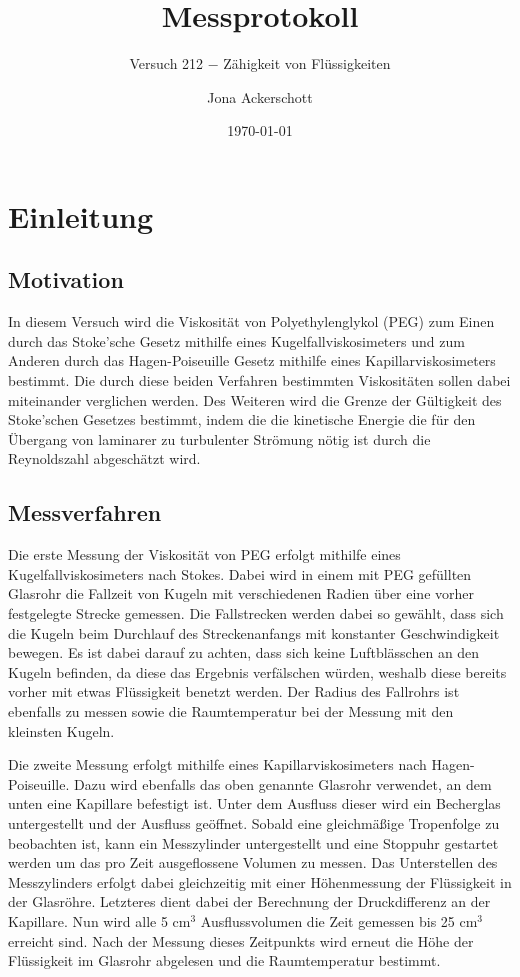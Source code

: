 \documentclass[12pt,a4paper,german]{scrartcl}
\author{Jona Ackerschott}
\title{Messprotokoll}
\subtitle{Versuch 212 $-$ Zähigkeit von Flüssigkeiten}
\date{\today}
\numberwithin{equation}{section}
\begin{document}
  \maketitle

  \tableofcontents

  \newpage
  \section{Einleitung}
  \subsection{Motivation}
  In diesem Versuch wird die Viskosität von Polyethylenglykol (PEG) zum Einen durch das Stoke'sche Gesetz mithilfe eines Kugelfallviskosimeters und zum Anderen durch das Hagen-Poiseuille Gesetz mithilfe eines Kapillarviskosimeters bestimmt.
  Die durch diese beiden Verfahren bestimmten Viskositäten sollen dabei miteinander verglichen werden.
  Des Weiteren wird die Grenze der Gültigkeit des Stoke'schen Gesetzes bestimmt, indem die die kinetische Energie die für den Übergang von laminarer zu turbulenter Strömung nötig ist durch die Reynoldszahl abgeschätzt wird.

  \subsection{Messverfahren}
  Die erste Messung der Viskosität von PEG erfolgt mithilfe eines Kugelfallviskosimeters nach Stokes.
  Dabei wird in einem mit PEG gefüllten Glasrohr die Fallzeit von Kugeln mit verschiedenen Radien über eine vorher festgelegte Strecke gemessen.
  Die Fallstrecken werden dabei so gewählt, dass sich die Kugeln beim Durchlauf des Streckenanfangs mit konstanter Geschwindigkeit bewegen.
  Es ist dabei darauf zu achten, dass sich keine Luftblässchen an den Kugeln befinden, da diese das Ergebnis verfälschen würden, weshalb diese bereits vorher mit etwas Flüssigkeit benetzt werden.
  Der Radius des Fallrohrs ist ebenfalls zu messen sowie die Raumtemperatur bei der Messung mit den kleinsten Kugeln.

  Die zweite Messung erfolgt mithilfe eines Kapillarviskosimeters nach Hagen-Poiseuille.
  Dazu wird ebenfalls das oben genannte Glasrohr verwendet, an dem unten eine Kapillare befestigt ist.
  Unter dem Ausfluss dieser wird ein Becherglas untergestellt und der Ausfluss geöffnet.
  Sobald eine gleichmäßige Tropenfolge zu beobachten ist, kann ein Messzylinder untergestellt und eine Stoppuhr gestartet werden um das pro Zeit ausgeflossene Volumen zu messen.
  Das Unterstellen des Messzylinders erfolgt dabei gleichzeitig mit einer Höhenmessung der Flüssigkeit in der Glasröhre.
  Letzteres dient dabei der Berechnung der Druckdifferenz an der Kapillare.
  Nun wird alle 5 cm$^3$ Ausflussvolumen die Zeit gemessen bis 25 cm$^3$ erreicht sind.
  Nach der Messung dieses Zeitpunkts wird erneut die Höhe der Flüssigkeit im Glasrohr abgelesen und die Raumtemperatur bestimmt.
\end{document}
